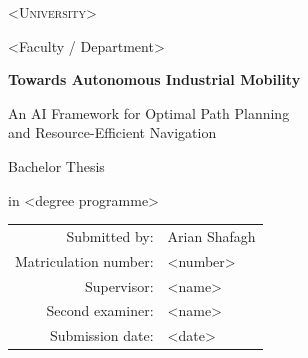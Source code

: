 \begin{titlepage}
\centering
\vspace*{2cm}

{\Large \textsc{<University>}\par}
{\large <Faculty / Department>\par}

\vspace{2.5cm}
{\huge\bfseries Towards Autonomous Industrial Mobility\par}
\vspace{0.6cm}
{\LARGE An AI Framework for Optimal Path Planning\\and Resource-Efficient Navigation\par}

\vspace{2cm}
{\large Bachelor Thesis\par}
\vspace{0.4cm}
{\large in <degree programme>\par}

\vspace{2cm}
\begin{tabular}{rl}
Submitted by:   & Arian Shafagh\\
Matriculation number: & <number>\\
Supervisor:     & <name>\\
Second examiner:& <name>\\
Submission date:& <date>\\
\end{tabular}

\vfill
\end{titlepage}
